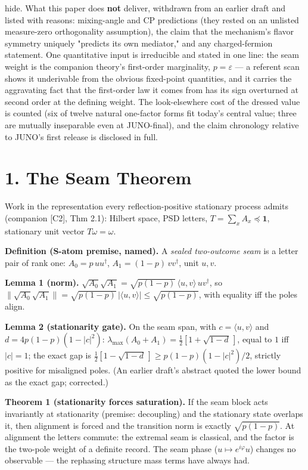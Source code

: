 \documentclass[11pt]{article}
\begin{document}
hide.  What this paper does \textbf{not} deliver, withdrawn from an earlier draft and listed with reasons: mixing-angle and CP predictions (they rested on an unlisted measure-zero orthogonality assumption), the claim that the mechanism's flavor symmetry uniquely "predicts its own mediator," and any charged-fermion statement.  One quantitative input is irreducible and stated in one line: the seam weight is the companion theory's first-order marginality, $p = \varepsilon$ — a referent scan shows it underivable from the obvious fixed-point quantities, and it carries the aggravating fact that the first-order law it comes from has its sign overturned at second order at the defining weight.  The look-elsewhere cost of the dressed value is counted (six of twelve natural one-factor forms fit today's central value; three are mutually inseparable even at JUNO-final), and the claim chronology relative to JUNO's first release is disclosed in full.

\section*{1. The Seam Theorem}
Work in the representation every reflection-positive stationary process admits (companion [C2], Thm 2.1): Hilbert space, PSD letters, $T = \sum_x A_x \preceq \mathbf 1$, stationary unit vector $T\omega = \omega$.

\textbf{Definition (S-atom premise, named).}  A \emph{sealed two-outcome seam} is a letter pair of rank one: $A_0 = p\,uu^\dagger$, $A_1 = (1-p)\,vv^\dagger$, unit $u, v$.

\textbf{Lemma 1 (norm).}  $\sqrt{A_0}\sqrt{A_1} = \sqrt{p(1-p)}\, \langle u,v\rangle\,uv^\dagger$, so $\lVert\sqrt{A_0}\sqrt{A_1} \rVert = \sqrt{p(1-p)}\,|\langle u,v\rangle| \le \sqrt{p(1-p)}$, with equality iff the poles align.

\textbf{Lemma 2 (stationarity gate).}  On the seam span, with $c = \langle u,v\rangle$ and $d = 4p(1-p)(1-|c|^2)$: $\lambda_{\max}(A_0+A_1) = \tfrac12[1 + \sqrt{1-d}\,]$, equal to $1$ iff $|c| = 1$; the exact gap is $\tfrac12[1 - \sqrt{1-d}\,] \ge p(1-p)(1-|c|^2)/2$, strictly positive for misaligned poles. (An earlier draft's abstract quoted the lower bound as the exact gap; corrected.)

\textbf{Theorem 1 (stationarity forces saturation).}  If the seam block acts invariantly at stationarity (premise: decoupling) and the stationary state overlaps it, then alignment is forced and the transition norm is exactly $\sqrt{p(1-p)}$.  At alignment the letters commute: the extremal seam is classical, and the factor is the two-pole weight of a definite record.  The seam phase ($u \mapsto e^{i\varphi}u$) changes no observable — the rephasing structure mass terms have always had.
\end{document}
